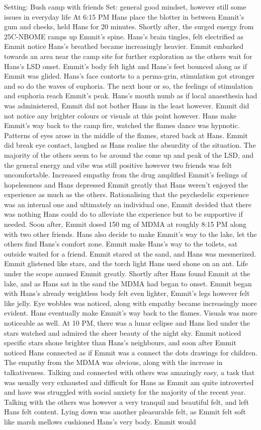 \documentclass[12pt]{book}
\begin{document}
Setting: Bush camp with friends Set: general good mindset, however still some issues in everyday life At 6:15 PM Hans place the blotter in between Emmit's gum and cheeks, held Hans for 20 minutes. Shortly after, the surged energy from 25C-NBOME ramps up Emmit's spine. Hans's brain tingles, felt electrified as Emmit notice Hans's breathed became increasingly heavier. Emmit embarked towards an area near the camp site for further exploration as the others wait for Hans's LSD onset. Emmit's body felt light and Hans's feet bounced along as if Emmit was glided. Hans's face contorts to a perma-grin, stimulation got stronger and so do the waves of euphoria. The next hour or so, the feelings of stimulation and euphoria reach Emmit's peak. Hans's mouth numb as if local anaesthesia had was administered, Emmit did not bother Hans in the least however. Emmit did not notice any brighter colours or visuals at this point however. Hans make Emmit's way back to the camp fire, watched the flames dance was hypnotic. Patterns of eyes arose in the middle of the flames, stared back at Hans. Emmit did break eye contact, laughed as Hans realise the absurdity of the situation. The majority of the others seem to be around the come up and peak of the LSD, and the general energy and vibe was still positive however two friends was felt uncomfortable. Increased empathy from the drug amplified Emmit's feelings of hopelessness and Hans depressed Emmit greatly that Hans weren't enjoyed the experience as much as the others. Rationalising that the psychedelic experience was an internal one and ultimately an individual one, Emmit decided that there was nothing Hans could do to alleviate the experience but to be supportive if needed. Soon after, Emmit dosed 150 mg of MDMA at roughly 8:15 PM along with two other friends. Hans also decide to make Emmit's way to the lake, let the others find Hans's comfort zone. Emmit make Hans's way to the toilets, sat outside waited for a friend. Emmit stared at the sand, and Hans was mesmerized. Emmit glistened like stars, and the torch light Hans used shone on an ant. Life under the scope amused Emmit greatly. Shortly after Hans found Emmit at the lake, and as Hans sat in the sand the MDMA had began to onset. Emmit began with Hans's already weightless body felt even lighter, Emmit's legs however felt like jelly. Eye wobbles was noticed, along with empathy became increasingly more evident. Hans eventually make Emmit's way back to the flames. Visuals was more noticeable as well. At 10 PM, there was a lunar eclipse and Hans lied under the stars watched and admired the sheer beauty of the night sky. Emmit noticed specific stars shone brighter than Hans's neighbours, and soon after Emmit noticed Hans connected as if Emmit was a connect the dots drawings for children. The empathy from the MDMA was obvious, along with the increase in talkativeness. Talking and connected with others was amazingly easy, a task that was usually very exhausted and difficult for Hans as Emmit am quite introverted and have was struggled with social anxiety for the majority of the recent year. Talking with the others was however a very tranquil and beautiful felt, and left Hans felt content. Lying down was another pleasurable felt, as Emmit felt soft like marsh mellows cushioned Hans's very body. Emmit would 
\end{document}
